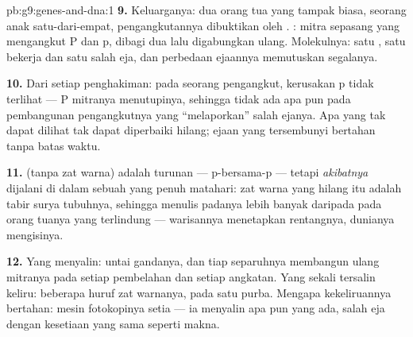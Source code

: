 \begin{solution}{pb:g9:genes-and-dna:1}
\textbf{9.} Keluarganya: dua orang tua yang tampak biasa,
seorang anak satu-dari-empat, pengangkutannya dibuktikan
oleh . : mitra sepasang yang
mengangkut P dan p, dibagi dua lalu digabungkan ulang.
Molekulnya: satu , satu  bekerja dan satu  salah
eja, dan perbedaan ejaannya memutuskan segalanya.

\textbf{10.} Dari setiap penghakiman: pada seorang
pengangkut, kerusakan p tidak terlihat --- P mitranya
menutupinya, sehingga tidak ada apa pun pada pembangunan
pengangkutnya yang ``melaporkan'' salah ejanya. Apa yang tak
dapat dilihat tak dapat diperbaiki hilang; ejaan yang
tersembunyi bertahan tanpa batas waktu.

\textbf{11.}  (tanpa zat warna) adalah turunan ---
p-bersama-p --- tetapi \emph{akibatnya} dijalani di dalam
sebuah  yang penuh matahari: zat warna yang hilang
itu adalah tabir surya tubuhnya, sehingga 
menulis padanya lebih banyak daripada pada orang tuanya yang
terlindung --- warisannya menetapkan rentangnya, dunianya
mengisinya.

\textbf{12.} Yang menyalin: untai gandanya, dan tiap
separuhnya membangun ulang mitranya pada setiap pembelahan
 dan setiap angkatan. Yang sekali tersalin keliru:
beberapa huruf  zat warnanya, pada satu  purba.
Mengapa kekeliruannya bertahan: mesin fotokopinya setia ---
ia menyalin apa pun yang ada, salah eja dengan kesetiaan yang
sama seperti makna.
\end{solution}
